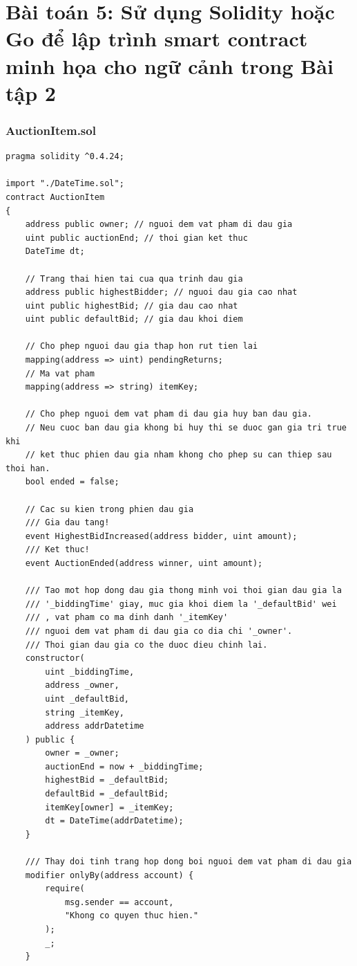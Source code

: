 \documentclass[a4paper]{article}
\begin{document}
\newpage


\section{Bài toán 5: Sử dụng Solidity hoặc Go để lập trình smart contract minh họa cho ngữ cảnh trong
Bài tập 2}
\begin{frame}
\frametitle{AuctionItem.sol}
                
\begin{lstlisting}[language = Solidity]
pragma solidity ^0.4.24;

import "./DateTime.sol";
contract AuctionItem
{
    address public owner; // nguoi dem vat pham di dau gia
    uint public auctionEnd; // thoi gian ket thuc
    DateTime dt;

    // Trang thai hien tai cua qua trinh dau gia
    address public highestBidder; // nguoi dau gia cao nhat
    uint public highestBid; // gia dau cao nhat
    uint public defaultBid; // gia dau khoi diem

    // Cho phep nguoi dau gia thap hon rut tien lai
    mapping(address => uint) pendingReturns;
    // Ma vat pham
    mapping(address => string) itemKey;

    // Cho phep nguoi dem vat pham di dau gia huy ban dau gia.
    // Neu cuoc ban dau gia khong bi huy thi se duoc gan gia tri true khi
    // ket thuc phien dau gia nham khong cho phep su can thiep sau thoi han.
    bool ended = false;

    // Cac su kien trong phien dau gia
    /// Gia dau tang!
    event HighestBidIncreased(address bidder, uint amount);
    /// Ket thuc!
    event AuctionEnded(address winner, uint amount);

    /// Tao mot hop dong dau gia thong minh voi thoi gian dau gia la
    /// '_biddingTime' giay, muc gia khoi diem la '_defaultBid' wei
    /// , vat pham co ma dinh danh '_itemKey'
    /// nguoi dem vat pham di dau gia co dia chi '_owner'.
    /// Thoi gian dau gia co the duoc dieu chinh lai.
    constructor(
        uint _biddingTime,
        address _owner,
        uint _defaultBid,
        string _itemKey,
        address addrDatetime
    ) public {
        owner = _owner;
        auctionEnd = now + _biddingTime;
        highestBid = _defaultBid;
        defaultBid = _defaultBid;
        itemKey[owner] = _itemKey;
        dt = DateTime(addrDatetime);
    }

    /// Thay doi tinh trang hop dong boi nguoi dem vat pham di dau gia
    modifier onlyBy(address account) {
        require(
            msg.sender == account,
            "Khong co quyen thuc hien."
        );
        _;
    }
    

\end{lstlisting}
\end{frame}
\end{document}
